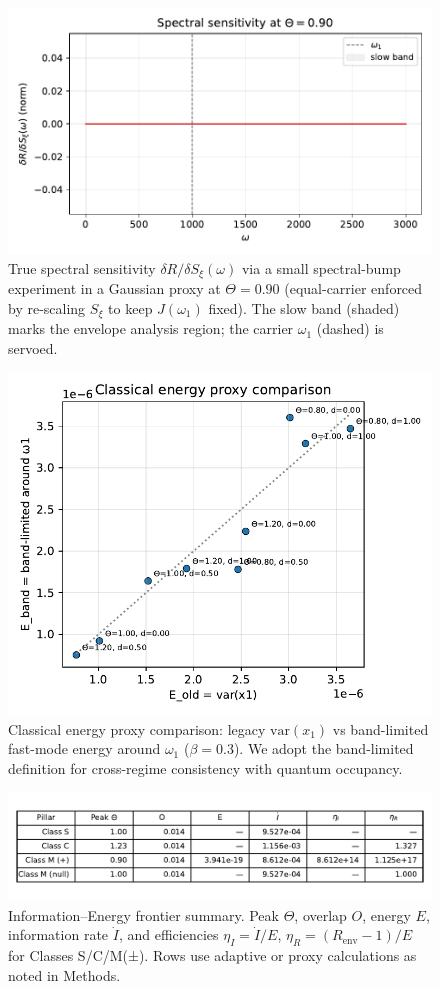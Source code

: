 \documentclass[11pt,letterpaper]{article}
\begin{document}
\begin{figure}[t]
\centering
\includegraphics[width=0.72\linewidth]{figM2_true_sensitivity.pdf}
\caption{True spectral sensitivity $\delta R/\delta S_\xi(\omega)$ via a small spectral-bump experiment in a Gaussian proxy at $\Theta=0.90$ (equal-carrier enforced by re-scaling $S_\xi$ to keep $J(\omega_1)$ fixed). The slow band (shaded) marks the envelope analysis region; the carrier $\omega_1$ (dashed) is servoed.}
\end{figure}

\begin{figure}[t]
\centering
\includegraphics[width=0.72\linewidth]{figN_energy_proxy_compare.pdf}
\caption{Classical energy proxy comparison: legacy $\mathrm{var}(x_1)$ vs band-limited fast-mode energy around $\omega_1$ ($\beta=0.3$). We adopt the band-limited definition for cross-regime consistency with quantum occupancy.}
\end{figure}

\begin{figure}[t]
\centering
\includegraphics[width=0.7\linewidth]{figTable_frontier.pdf}
\caption{Information–Energy frontier summary. Peak $\Theta$, overlap $O$, energy $E$, information rate $\dot I$, and efficiencies $\eta_I=\dot I/E$, $\eta_R=(R_{\mathrm{env}}-1)/E$ for Classes S/C/M(±). Rows use adaptive or proxy calculations as noted in Methods.}
\end{figure}
\end{document}
